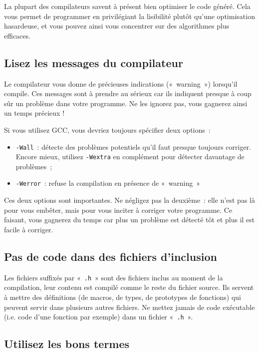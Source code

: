 \documentclass {article}
\begin{document}
La plupart des compilateurs savent à présent bien optimiser le code
généré. Cela vous permet de programmer en privilégiant la lisibilité
plutôt qu'une optimisation hasardeuse, et vous pouvez ainsi vous
concentrer sur des algorithmes plus efficaces.


\subsection {Lisez les messages du compilateur}

Le compilateur vous donne de précieuses indications («~warning~»)
lorsqu'il compile. Ces messages sont à prendre au sérieux car ils
indiquent presque à coup sûr un problème dans votre programme. Ne
les ignorez pas, vous gagnerez ainsi un temps précieux !

Si vous utilisez GCC, vous devriez toujours spécifier deux options~:
\begin {itemize}
    \item \texttt {-Wall}~: détecte des problèmes potentiels qu'il
	faut presque toujours corriger. Encore mieux, utilisez
	\texttt {-Wextra} en complément pour détecter davantage
	de problèmes~;
    \item \texttt {-Werror}~: refuse la compilation en présence de
	«~warning~»
\end {itemize}

Ces deux options sont importantes. Ne négligez pas la deuxième~: elle
n'est pas là pour vous embêter, mais pour vous inciter à corriger votre
programme. Ce faisant, vous gagnerez du temps car plus un problème est
détecté tôt et plus il est facile à corriger.

\subsection {Pas de code dans des fichiers d'inclusion}

Les fichiers suffixés par «~\texttt {.h}~» sont des fichiers inclus
au moment de la compilation, leur contenu est compilé comme le reste
du fichier source. Ils servent à mettre des définitions (de macros,
de types, de prototypes de fonctions) qui peuvent servir dans plusieurs
autres fichiers. Ne mettez jamais de code exécutable (i.e. code d'une
fonction par exemple) dans un fichier «~\texttt {.h}~».


\subsection {Utilisez les bons termes}
\end{document}
